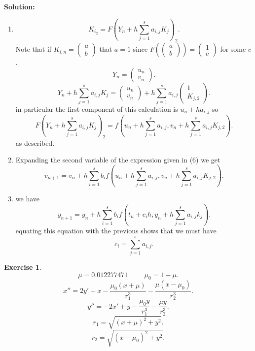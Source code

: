 \documentclass[a4paper,12pt]{scrartcl} %
\newenvironment{solution}
  {\par\color{answercolor}\textbf{Solution:}\ }
  {\par}
\newcounter{customcounter}
\theoremstyle{darktheorem}
\newtheorem{exercise}[customcounter]{Exercise}
\begin{document}
\begin{solution}
    \begin{enumerate}
        \item 
            \[
                K_{i_2} = F(Y_n + h \sum_{j=1}^{s}a_{i,j}K_j)_{2}
            .\] 
            Note that if $K_{i,n} = \begin{pmatrix} a \\ b \end{pmatrix} $ that $a = 1$ since $F(\begin{pmatrix} a \\ b \end{pmatrix} ) = \begin{pmatrix} 1 \\ c \end{pmatrix} $ for some $c$.
            \[
            Y_n = \begin{pmatrix} u_n \\ v_n \end{pmatrix} 
            .\] 
            \[
                Y_n + h \sum_{j=1}^{s}a_{i,j}K_j = \begin{pmatrix} u_n \\ v_n \end{pmatrix} + h \sum_{j=1}^{s}a_{i,j}\begin{pmatrix} 1 \\ K_{j,2} \end{pmatrix} 
            .\] 
            in particular the first component of this calculation is $u_n + ha_{i,j}$ so
            \[
                F(Y_n + h \sum_{j=1}^{s}a_{i,j}K_j)_2 = f(u_n + h\sum_{j=1}^{s}a_{i,j}, v_n + h \sum_{j=1}^{s}a_{i,j}K_{j,2})
            .\] 
            as described.
        \item Expanding the second variable of the expression given in (6) we get
            \[
                v_{n+1} = v_n + h \sum_{i=1}^{s}b_i f(u_n + h\sum_{j=1}^{s}a_{i,j}, v_n + h \sum_{j=1}^{s}a_{i,j}K_{j,2})
            .\] 
        \item we have
            \[
                y_{n+1} = y_n + h \sum_{i=1}^{s}b_if(t_n + c_ih, y_n + h\sum_{j=1}^{s}a_{i,j}k_j)
            .\] 
            equating this equation with the previous shows that we must have
            \[
                c_i = \sum_{j=1}^{s}a_{i,j}
            .\] 
    \end{enumerate}
\end{solution}
\begin{exercise}
    \[
        \mu = 0.012277471 \hspace{1cm} \mu_0 = 1-\mu
    .\] 
    \[
    x'' = 2y' + x - \frac{\mu_0(x+\mu)}{r_1^{3}} - \frac{\mu(x-\mu_0)}{r_2^{3}}
    .\] 
    \[
    y'' = -2x' + y - \frac{\mu_0y}{r_1^{3}} - \frac{\mu y}{r_2^{3}}
    .\] 
    \[
    r_1 = \sqrt{(x+\mu)^2 + y^2}
    .\] 
    \[
    r_2 = \sqrt{(x-\mu_0)^2 + y^2}
    .\] 
\end{exercise}
\end{document}
